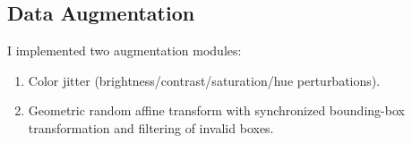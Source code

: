 \subsection{Data Augmentation}
I implemented two augmentation modules:
\begin{enumerate}
    \item Color jitter (brightness/contrast/saturation/hue perturbations).
    \item Geometric random affine transform with synchronized bounding-box transformation and filtering of invalid boxes.
\end{enumerate}

